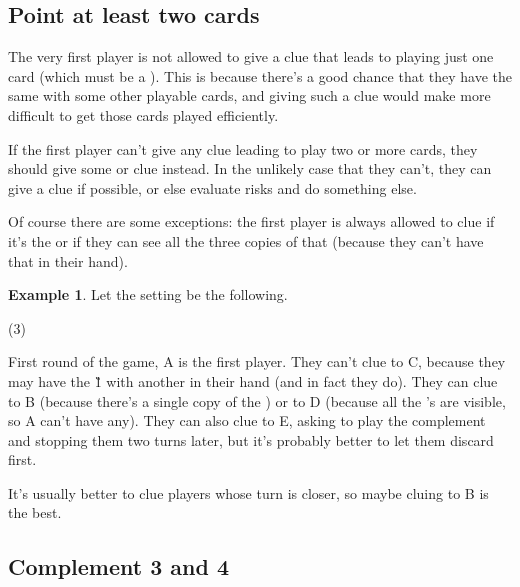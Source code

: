 \documentclass[a4paper]{article}
\theoremstyle{plain}
\theoremstyle{definition}
\newtheorem{example}[theorem]{Example}
\begin{document}
\subsection{Point at least two cards}

The very first player is not allowed to give a clue that leads to playing just one card (which must be a ). This is because there's a good chance that they have the same  with some other playable cards, and giving such a clue would make more difficult to get those cards played efficiently.

If the first player can't give any clue leading to play two or more cards, they should give some  or  clue instead. In the unlikely case that they can't, they can give a  clue if possible, or else evaluate risks and do something else.

Of course there are some exceptions: the first player is always allowed to clue  if it's the  or if they can see all the three copies of that  (because they can't have that  in their hand).

\begin{example}
	
	Let the setting be the following.
	
	\begin{tasks}(3)
		\task[+]      
		\task[A]    
		\task[B]    
		\task[C]    
		\task[D]    
		\task[E]    
	\end{tasks}
	
	First round of the game, A is the first player. They can't clue  to C, because they may have the \G{1} with another  in their hand (and in fact they do). They can clue  to B (because there's a single copy of the ) or to D (because all the 's are visible, so A can't have any). They can also clue  to E, asking to play the complement and stopping them two turns later, but it's probably better to let them discard first.
	
	It's usually better to clue players whose turn is closer, so maybe cluing  to B is the best.
\end{example}

\subsection{Complement 3 and 4}
\end{document}
